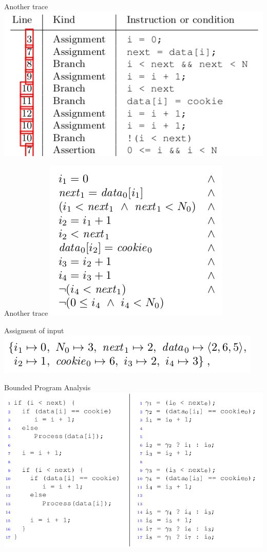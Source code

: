 \documentclass{beamer}
\begin{document}
\begin{frame}{Another trace}
\includegraphics[scale=0.5]{trace2.png}
\end{frame}

\begin{frame}{Another trace}
\includegraphics[scale=0.5]{path_constraint2.png}
\end{frame}

\begin{frame}{Assigment of input}
\includegraphics[scale=0.5]{eval.png}
\end{frame}

\begin{frame}{Bounded Program Analysis}
\includegraphics[scale=0.45]{bounded_program_analysis.png}
\end{frame}
\end{document}

